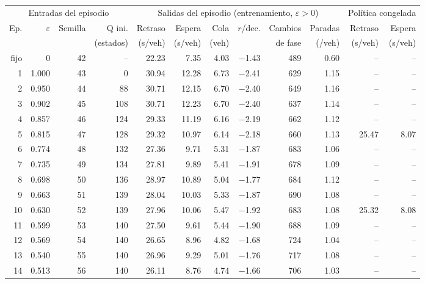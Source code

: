 \begin{table}[H]
\centering
\scriptsize
\setlength{\tabcolsep}{3pt}
\begin{tabular}{rrrrrrrrrrrr}
\toprule
\multicolumn{4}{c}{Entradas del episodio} & \multicolumn{6}{c}{Salidas del episodio (entrenamiento, $\varepsilon>0$)} & \multicolumn{2}{c}{Política congelada} \\
\cmidrule(lr){1-4}\cmidrule(lr){5-10}\cmidrule(lr){11-12}
Ep. & $\varepsilon$ & Semilla & Q ini. & Retraso & Espera & Cola & $r$/dec. & Cambios & Paradas & Retraso & Espera \\
 &  &  & (estados) & (s/veh) & (s/veh) & (veh) &  & de fase & (/veh) & (s/veh) & (s/veh) \\
\midrule
fijo & 0 & 42 & -- & 22.23 & 7.35 & 4.03 & $-$1.43 & 489 & 0.60 & -- & -- \\
\midrule
1 & 1.000 & 43 & 0 & 30.94 & 12.28 & 6.73 & $-$2.41 & 629 & 1.15 & -- & -- \\
2 & 0.950 & 44 & 88 & 30.71 & 12.15 & 6.70 & $-$2.40 & 649 & 1.16 & -- & -- \\
3 & 0.902 & 45 & 108 & 30.71 & 12.23 & 6.70 & $-$2.40 & 637 & 1.14 & -- & -- \\
4 & 0.857 & 46 & 124 & 29.33 & 11.19 & 6.16 & $-$2.19 & 662 & 1.12 & -- & -- \\
5 & 0.815 & 47 & 128 & 29.32 & 10.97 & 6.14 & $-$2.18 & 660 & 1.13 & 25.47 & 8.07 \\
6 & 0.774 & 48 & 132 & 27.36 & 9.71 & 5.31 & $-$1.87 & 683 & 1.06 & -- & -- \\
7 & 0.735 & 49 & 134 & 27.81 & 9.89 & 5.41 & $-$1.91 & 678 & 1.09 & -- & -- \\
8 & 0.698 & 50 & 136 & 28.97 & 10.89 & 5.04 & $-$1.77 & 684 & 1.12 & -- & -- \\
9 & 0.663 & 51 & 139 & 28.04 & 10.03 & 5.33 & $-$1.87 & 690 & 1.08 & -- & -- \\
10 & 0.630 & 52 & 139 & 27.96 & 10.06 & 5.47 & $-$1.92 & 683 & 1.08 & 25.32 & 8.08 \\
11 & 0.599 & 53 & 140 & 27.50 & 9.61 & 5.44 & $-$1.90 & 688 & 1.09 & -- & -- \\
12 & 0.569 & 54 & 140 & 26.65 & 8.96 & 4.82 & $-$1.68 & 724 & 1.04 & -- & -- \\
13 & 0.540 & 55 & 140 & 26.96 & 9.29 & 5.01 & $-$1.76 & 717 & 1.08 & -- & -- \\
14 & 0.513 & 56 & 140 & 26.11 & 8.76 & 4.74 & $-$1.66 & 706 & 1.03 & -- & -- \\

\end{tabular}
\end{table}
